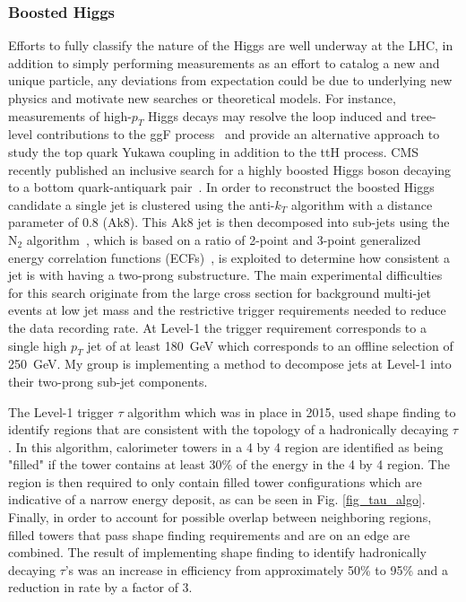 \documentclass[preprint,12pt]{elsarticle}
\begin{document}
\subsubsection{Boosted Higgs}
Efforts to fully classify the nature of the Higgs are well underway at the LHC,
in addition to simply performing measurements as an effort to catalog a new 
and unique particle, any deviations from expectation could be due to underlying new physics
and motivate new searches or theoretical models. 
For instance, measurements of high-$p_{T}$ Higgs decays may resolve the loop induced 
and tree-level 
contributions to the ggF process~\cite{Grojean_2014} and provide an alternative 
approach to study the top quark Yukawa coupling in addition to the ttH process.
CMS recently published an inclusive search for a highly boosted Higgs boson decaying
to a bottom quark-antiquark pair~\cite{Sirunyan_HBB_2018}. 
In order to reconstruct the boosted Higgs candidate a single jet is clustered using
the anti-$k_{T}$ algorithm with a distance parameter of 0.8 (Ak8). This Ak8 jet is
then decomposed into sub-jets using the N$_{2}$ algorithm~\cite{Moult_2016}, 
which is based on a ratio of 2-point and 3-point generalized energy correlation 
functions (ECFs)~\cite{Larkoski_2013}, is exploited to determine how consistent a 
jet is with having a two-prong substructure.
The main experimental difficulties for this search originate from the large
cross section for background multi-jet events at low jet mass and the restrictive trigger requirements needed to reduce the data recording rate. 
At Level-1 the trigger requirement corresponds to a single high $p_{T}$ jet of at 
least 180~GeV which corresponds to an offline selection of 250~GeV. My group
is implementing a method to decompose jets at Level-1 into their two-prong 
sub-jet components.

The Level-1 trigger $\tau$ algorithm which was in place in 2015, used shape finding
to identify regions that are consistent with the topology of a hadronically
decaying $\tau$. In this algorithm, calorimeter towers in a 4 by 4 region are identified
as being "filled" if the tower contains at least 30\% of the energy in the 4 by 4 region.  
The region is then required to only contain filled tower configurations which are indicative
of a narrow energy deposit, as can be seen in Fig. \ref{fig_tau_algo}. Finally, in order
to account for possible overlap between neighboring regions, filled towers that pass shape
finding requirements and are on an edge are combined. %
The result of implementing shape finding to identify hadronically
decaying $\tau$'s was an increase in efficiency from approximately 50\% to 95\%
and a reduction in rate by a factor of 3. 
\end{document}
